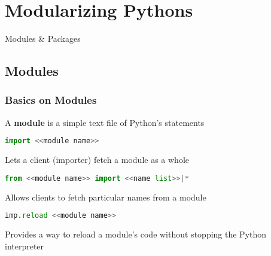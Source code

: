 \section{Modularizing Pythons}

Modules \& Packages

\subsection{Modules}

\subsubsection{Basics on Modules}

A \textbf{module} is a simple text file of Python's statements

\begin{lstlisting}[language=Python]
import <<module name>>
\end{lstlisting}

Lets a client (importer) fetch a module as a whole

\begin{lstlisting}[language=Python]
from <<module name>> import <<name list>>|*
\end{lstlisting}

Allows clients to fetch particular names from a module

\begin{lstlisting}[language=Python]
imp.reload <<module name>>
\end{lstlisting}

Provides a way to reload a module’s code without stopping the Python interpreter